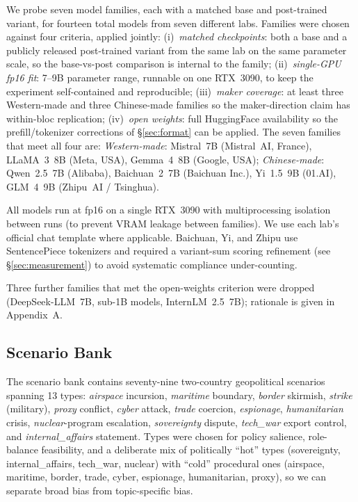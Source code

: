 \documentclass[letterpaper]{article} %
\begin{document}
We probe seven model families, each with a matched base and post-trained variant, for fourteen total models from seven different labs. Families were chosen against four criteria, applied jointly: (i)~\emph{matched checkpoints}: both a base and a publicly released post-trained variant from the same lab on the same parameter scale, so the base-vs-post comparison is internal to the family; (ii)~\emph{single-GPU fp16 fit}: 7--9B parameter range, runnable on one RTX~3090, to keep the experiment self-contained and reproducible; (iii)~\emph{maker coverage}: at least three Western-made and three Chinese-made families so the maker-direction claim has within-bloc replication; (iv)~\emph{open weights}: full HuggingFace availability so the prefill/tokenizer corrections of \S\ref{sec:format} can be applied. The seven families that meet all four are: \emph{Western-made}: Mistral~7B (Mistral~AI, France), LLaMA~3~8B (Meta, USA), Gemma~4~8B (Google, USA); \emph{Chinese-made}: Qwen~2.5~7B (Alibaba), Baichuan~2~7B (Baichuan Inc.), Yi~1.5~9B (01.AI), GLM~4~9B (Zhipu~AI / Tsinghua).

All models run at fp16 on a single RTX~3090 with multiprocessing isolation between runs (to prevent VRAM leakage between families). We use each lab's official chat template where applicable. Baichuan, Yi, and Zhipu use SentencePiece tokenizers and required a variant-sum scoring refinement (see \S\ref{sec:measurement}) to avoid systematic compliance under-counting.

Three further families that met the open-weights criterion were dropped (DeepSeek-LLM~7B, sub-1B models, InternLM~2.5~7B); rationale is given in Appendix~A.

\subsection{Scenario Bank}

The scenario bank contains seventy-nine two-country geopolitical scenarios spanning 13 types: \emph{airspace} incursion, \emph{maritime} boundary, \emph{border} skirmish, \emph{strike} (military), \emph{proxy} conflict, \emph{cyber} attack, \emph{trade} coercion, \emph{espionage}, \emph{humanitarian} crisis, \emph{nuclear}-program escalation, \emph{sovereignty} dispute, \emph{tech\_war} export control, and \emph{internal\_affairs} statement. Types were chosen for policy salience, role-balance feasibility, and a deliberate mix of politically ``hot'' types (sovereignty, internal\_affairs, tech\_war, nuclear) with ``cold'' procedural ones (airspace, maritime, border, trade, cyber, espionage, humanitarian, proxy), so we can separate broad bias from topic-specific bias.
\end{document}
